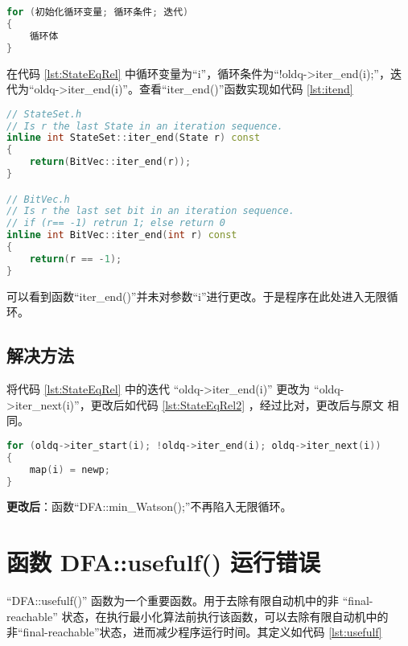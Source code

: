 \begin{lstlisting}[language=C++,label={lst:for},caption={for 循环的一般格式}]
for (初始化循环变量; 循环条件; 迭代)
{
    循环体
}
\end{lstlisting}
在代码 \ref{lst:StateEqRel} 中循环变量为“i”，循环条件为“!oldq->iter\_end(i);”，迭代为“oldq->iter\_end(i)”。查看“iter\_end()”函数实现如代码 \ref{lst:itend}

\begin{lstlisting}[language=C++,label={lst:itend},caption={函数 iter\_end() 的实现}]
// StateSet.h
// Is r the last State in an iteration sequence.
inline int StateSet::iter_end(State r) const
{
	return(BitVec::iter_end(r));
}

// BitVec.h
// Is r the last set bit in an iteration sequence.
// if (r== -1) retrun 1; else return 0
inline int BitVec::iter_end(int r) const
{
	return(r == -1);
}
\end{lstlisting}
可以看到函数“iter\_end()”并未对参数“i”进行更改。于是程序在此处进入无限循环。

\subsection{解决方法}

将代码 \ref{lst:StateEqRel} 中的迭代 “oldq->iter\_end(i)” 更改为 “oldq->iter\_next(i)”，更改后如代码 \ref{lst:StateEqRel2} ，经过比对，更改后与原文 \cite{watson1994design} 相同。

\begin{lstlisting}[language=C++,label={lst:StateEqRel2},caption={StateEqRel.cpp}]
for (oldq->iter_start(i); !oldq->iter_end(i); oldq->iter_next(i))
{
    map(i) = newp;
}
\end{lstlisting}

{\bfseries 更改后}：函数“DFA::min\_Watson();”不再陷入无限循环。


\section{函数 DFA::usefulf() 运行错误}\label{sec:usefulf}

“DFA::usefulf()” 函数为一个重要函数。用于去除有限自动机中的非 “final-reachable” 状态，在执行最小化算法前执行该函数，可以去除有限自动机中的非“final-reachable”状态，进而减少程序运行时间。其定义如代码 \ref{lst:usefulf}

